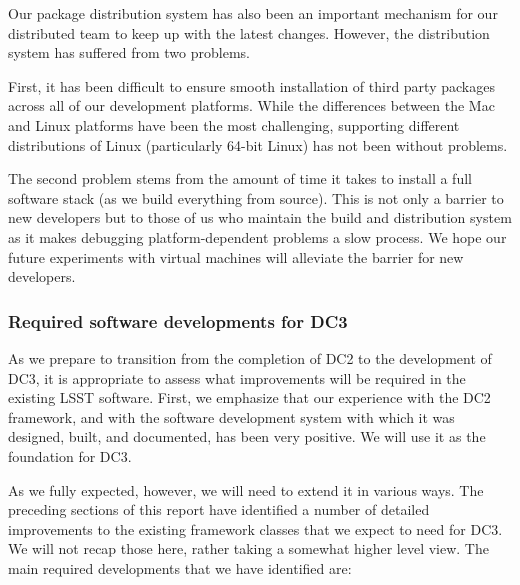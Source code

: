 Our package distribution system has also been an important mechanism for our distributed team to keep up with the latest changes.  However, the distribution system has suffered from two problems.

First, it has been difficult to ensure smooth installation of third party packages across all of our development platforms.  While the differences between the Mac and Linux platforms have been the most challenging, supporting different distributions of Linux (particularly 64-bit Linux) has not been without problems.

The second problem stems from the amount of time it takes to install a full software stack (as we build everything from source).  This is not only a barrier to new developers but to those of us who maintain the build and distribution system as it makes debugging platform-dependent problems a slow process.  We hope our future experiments with virtual machines will alleviate the barrier for new developers.  

\subsubsection*{Required software developments for DC3}

As we prepare to transition from the completion of DC2 to the development of DC3, it is appropriate to assess what improvements will be required in the existing LSST software.  First, we emphasize that our experience with the DC2 framework, and with the software development system with which it was designed, built, and documented, has been very positive.  We will use it as the foundation for DC3.

As we fully expected, however, we will need to extend it in various ways. The preceding sections of this report have identified a number of detailed improvements to the existing framework classes that we expect to need for DC3.  We will not recap those here, rather taking a somewhat higher level view.  The main required developments that we have identified are:

